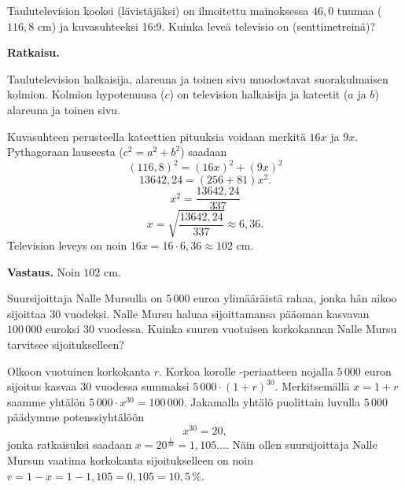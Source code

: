 \begin{esimerkki}
Taulutelevision kooksi (lävistäjäksi) on ilmoitettu mainoksessa $46,0$ tuumaa ($116,8$ cm) ja kuvasuhteeksi 16:9. Kuinka leveä televisio on (senttimetreinä)?

{\bf Ratkaisu.}

Taulutelevision halkaisija, alareuna ja toinen sivu muodostavat suorakulmaisen kolmion. Kolmion hypotenuusa ($c$) on television halkaisija ja kateetit ($a$ ja $b$) alareuna ja toinen sivu.

Kuvasuhteen perusteella kateettien pituuksia voidaan merkitä $16x$ ja $9x$. Pythagoraan lauseesta ($c^2 = a^2 + b^2$) saadaan
\[
(116,8)^2 = (16x)^2 + (9x)^2
\]
\[
13642,24 = (256+81)x^2.
\]
\[
x^2 = \frac{13642,24}{337}
\]
\[
x= \sqrt{\frac{13642,24}{337}} \approx 6,36.
\]
Television leveys on noin $16x = 16\cdot 6,36\approx 102$ cm.

{\bf Vastaus.} Noin $102$ cm.
\end{esimerkki}


\begin{esimerkki}
	Suursijoittaja Nalle Mursulla on $5\,000$ euroa ylimääräistä rahaa, jonka hän aikoo sijoittaa $30$ vuodeksi.  Nalle Mursu haluaa sijoittamansa pääoman kasvavan $100\,000$ euroksi $30$ vuodessa.  Kuinka suuren vuotuisen korkokannan Nalle Mursu tarvitsee sijoitukselleen? 
	\begin{esimratk}
		Olkoon vuotuinen korkokanta $r$. Korkoa korolle -periaatteen nojalla $5\,000$ euron sijoitus
		kasvaa $30$ vuodessa summaksi $5\,000\cdot(1+r)^{30}$. Merkitsemällä $x=1+r$ saamme yhtälön $5\,000\cdot x^{30} = 100\,000$.
		Jakamalla yhtälö puolittain luvulla $5\,000$ päädymme potenssiyhtälöön
		\[ x^{30} = 20, \] 
		jonka ratkaisuksi saadaan $x=20^{\frac{1}{30}} = 1{,}105\ldots$. Näin
		ollen suursijoittaja Nalle Mursun vaatima korkokanta sijoitukselleen on noin $r=1-x=1-1,105=0,105=10{,}5\,\%$.
	\end{esimratk}
\end{esimerkki}
